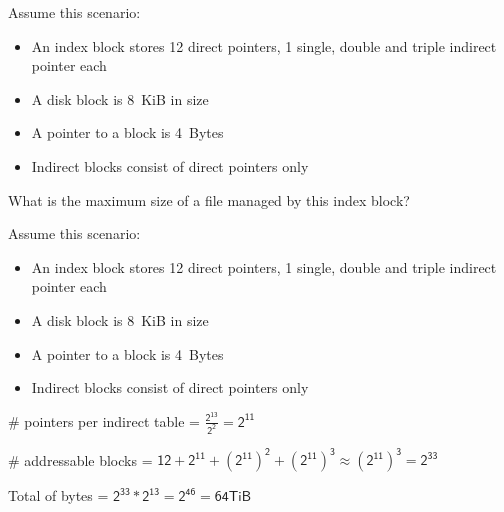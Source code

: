   \begin{slide}
    
    
    Assume this scenario:

    \begin{itemize}
      \item An index block stores 12 direct pointers, 1 single, double and
            triple indirect pointer each
      \item A disk block is 8~KiB in size
      \item A pointer to a block is 4~Bytes
      \item Indirect blocks consist of direct pointers only
    \end{itemize}
    \medskip

    What is the maximum size of a file managed by this index block?

  \end{slide}

  \begin{slide}
    
    
    Assume this scenario:

    \begin{itemize}
      \item An index block stores 12 direct pointers, 1 single, double and triple indirect pointer each
      \item A disk block is 8~KiB in size
      \item A pointer to a block is 4~Bytes
      \item Indirect blocks consist of direct pointers only
    \end{itemize}
    \medskip

    \# pointers per indirect table = $\mathsf{\frac{2^{13}}{2^2} = 2^{11}}$

    \# addressable blocks = $\mathsf{12 + 2^{11} + (2^{11})^2 + (2^{11})^3 \approx (2^{11})^3 = 2^{33}}$

    Total of bytes = $\mathsf{2^{33} * 2^{13} = 2^{46} = 64 TiB}$

  \end{slide}

